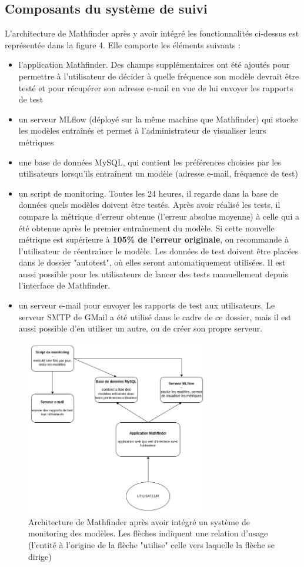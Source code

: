 \documentclass[french]{article}
\begin{document}
    \subsection{Composants du système de suivi}
    L'architecture de Mathfinder après y avoir intégré les fonctionnalités ci-dessus est représentée dans la figure 4. Elle comporte les éléments suivants :
    \begin{itemize}
        \item l'application Mathfinder. Des champs supplémentaires ont été ajoutés pour permettre à l'utilisateur de décider à quelle fréquence son modèle devrait être testé et pour récupérer son adresse e-mail en vue de lui envoyer les rapports de test
        \item un serveur MLflow (déployé sur la même machine que Mathfinder) qui stocke les modèles entraînés et permet à l'administrateur de visualiser leurs métriques
        \item une base de données MySQL, qui contient les préférences choisies par les utilisateurs lorsqu'ils entraînent un modèle (adresse e-mail, fréquence de test)
        \item un script de monitoring. Toutes les 24 heures, il regarde dans la base de données quels modèles doivent être testés. Après avoir réalisé les tests, il compare la métrique d'erreur obtenue (l'erreur absolue moyenne) à celle qui a été obtenue après le premier entraînement du modèle. Si cette nouvelle métrique est supérieure à \textbf{105\% de l'erreur originale}, on recommande à l'utilisateur de réentraîner le modèle. Les données de test doivent être placées dans le dossier "autotest", où elles seront automatiquement utilisées. Il est aussi possible pour les utilisateurs de lancer des tests manuellement depuis l'interface de Mathfinder.
        \item un serveur e-mail pour envoyer les rapports de test aux utilisateurs. Le serveur SMTP de GMail a été utilisé dans le cadre de ce dossier, mais il est aussi possible d'en utiliser un autre, ou de créer son propre serveur.
    \end{itemize}
    \begin{figure}[h!]
        \includegraphics[width=8cm]{monitoring_E5}
        \centering
        \caption{Architecture de Mathfinder après avoir intégré un système de monitoring des modèles. Les flèches indiquent une relation d'usage (l'entité à l'origine de la flèche "utilise" celle vers laquelle la flèche se dirige)}
        \centering
    \end{figure}
\end{document}
